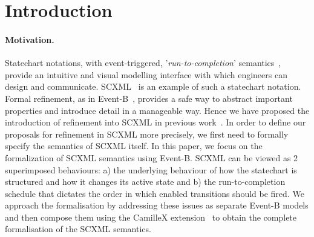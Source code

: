 \section{Introduction}
\label{sec:introduction}


\paragraph{Motivation.} Statechart notations, with event-triggered, '\emph{run-to-completion}' semantics~\cite{HAREL1987231,harel1996executable}, provide an intuitive and visual modelling interface with which engineers can design and communicate.  
SCXML~\cite{scxmlwebsite} is an  example of such a statechart notation.
Formal refinement, as in  Event-B~\cite{abrial10:_model_event_b}, provides a safe way to abstract important properties and introduce detail in a manageable way.
Hence we have proposed the introduction of refinement into SCXML in previous work~\cite{Morris2018,Morris2020,DBLP:journals/isse/MorrisSHHAB22}. 
In order to define our proposals for refinement in SCXML more precisely, we first need to formally specify the  semantics of SCXML itself. 
In this paper, we focus on the formalization of SCXML semantics using Event-B. 
SCXML can be viewed as 2 superimposed behaviours:  a) the underlying behaviour of how the statechart is structured and how it changes its active state and  b) the run-to-completion schedule that dictates the order in which enabled  transitions should be fired.
We  approach the formalisation by addressing these issues as separate Event-B models and then compose them using the CamilleX extension~\cite{DBLP:conf/sefm/HoangSDFB22} to obtain the complete formalisation of the SCXML semantics.


